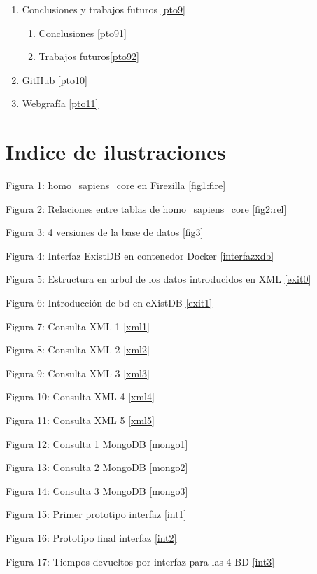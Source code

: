\documentclass[12pt,a4paper]{article}
\begin{document}
\begin{enumerate}
\item Conclusiones y trabajos futuros  \ref{pto9}

	\begin{enumerate}[label*=\arabic*.]
			\item Conclusiones \ref{pto91}
			\item Trabajos futuros\ref{pto92}
		\end{enumerate}
		
\item GitHub \ref{pto10}
\item Webgrafía \ref{pto11} 
\end{enumerate}

\newpage
\section*{Indice de ilustraciones}



Figura 1:  homo\_sapiens\_core en Firezilla \ref{fig1:fire}

Figura 2: Relaciones entre tablas de homo\_sapiens\_core \ref{fig2:rel}

Figura 3: 4 versiones de la base de datos  \ref{fig3}

Figura 4: Interfaz ExistDB en contenedor Docker \ref{interfazxdb}

Figura 5: Estructura en arbol de los datos introducidos en XML \ref{exit0}

Figura 6: Introducción de bd en eXistDB \ref{exit1}

Figura 7: Consulta XML 1 \ref{xml1}

Figura 8: Consulta XML 2 \ref{xml2}

Figura 9: Consulta XML 3 \ref{xml3}

Figura 10: Consulta XML 4 \ref{xml4}

Figura 11: Consulta XML 5 \ref{xml5}

Figura 12: Consulta 1 MongoDB \ref{mongo1}

Figura 13: Consulta 2 MongoDB \ref{mongo2}

Figura 14: Consulta 3 MongoDB \ref{mongo3}

Figura 15: Primer prototipo interfaz \ref{int1}

Figura 16: Prototipo final interfaz \ref{int2}

Figura 17: Tiempos devueltos por interfaz para las 4 BD \ref{int3}
\end{document}
